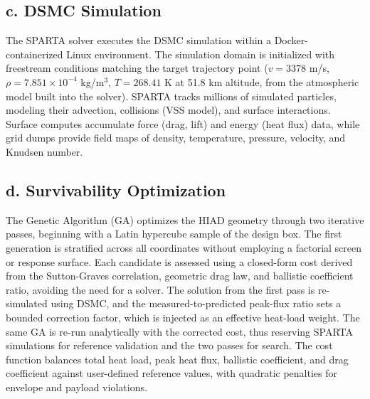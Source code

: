 \subsection*{c. DSMC Simulation}
The SPARTA solver executes the DSMC simulation within a Docker-containerized Linux environment. The simulation domain is initialized with freestream conditions matching the target trajectory point ($v = 3378$ m/s, $\rho = 7.851 \times 10^{-4}$ kg/m$^3$, $T = 268.41$ K at 51.8 km altitude, from the atmospheric model built into the solver). SPARTA tracks millions of simulated particles, modeling their advection, collisions (VSS model), and surface interactions. Surface computes accumulate force (drag, lift) and energy (heat flux) data, while grid dumps provide field maps of density, temperature, pressure, velocity, and Knudsen number.


\subsection*{d. Survivability Optimization}
The Genetic Algorithm (GA) optimizes the HIAD geometry through two iterative passes, beginning with a Latin hypercube sample of the design box. The first generation is stratified across all coordinates without employing a factorial screen or response surface. Each candidate is assessed using a closed-form cost derived from the Sutton-Graves correlation, geometric drag law, and ballistic coefficient ratio, avoiding the need for a solver. The solution from the first pass is re-simulated using DSMC, and the measured-to-predicted peak-flux ratio sets a bounded correction factor, which is injected as an effective heat-load weight. The same GA is re-run analytically with the corrected cost, thus reserving SPARTA simulations for reference validation and the two passes for search. The cost function balances total heat load, peak heat flux, ballistic coefficient, and drag coefficient against user-defined reference values, with quadratic penalties for envelope and payload violations.

